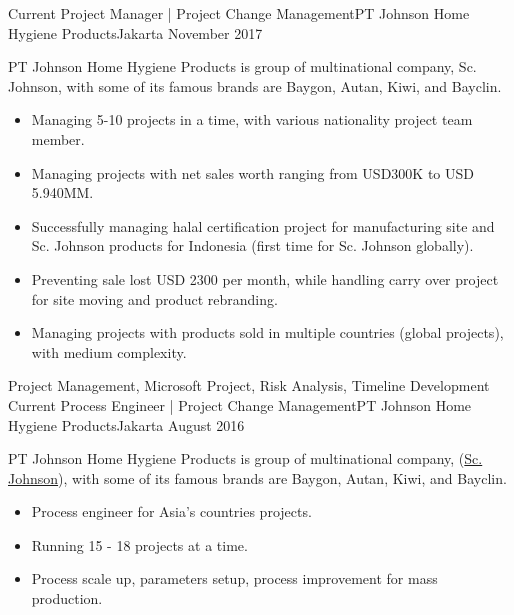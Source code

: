 %
%
%
\begin{experiences}
  \experience
    {Current} {Project Manager | Project Change Management}{PT Johnson Home Hygiene Products}{Jakarta}
    {November 2017} {PT Johnson Home Hygiene Products is group of multinational company, Sc. Johnson, with some of its famous brands are Baygon, Autan, Kiwi, and Bayclin.
                      \begin{itemize}
                        \item Managing 5-10 projects in a time, with various nationality project team member.                
                        \item Managing projects with net sales worth ranging from USD300K to USD 5.940MM.               
                        \item Successfully managing halal certification project for manufacturing site and Sc. Johnson products for Indonesia (first time for Sc. Johnson globally).              
                        \item Preventing sale lost USD 2300 per month, while handling carry over project for site moving and product rebranding.
                        \item Managing projects with products sold in multiple countries (global projects), with medium complexity.
                      \end{itemize}
                    }
                    {Project Management, Microsoft Project, Risk Analysis, Timeline Development}
  \emptySeparator
  \experience
    {Current} {Process Engineer | Project Change Management}{PT Johnson Home Hygiene Products}{Jakarta}
    {August 2016} {PT Johnson Home Hygiene Products is group of multinational company, (\href{https://www.scjohnson.com/}{Sc. Johnson}), with some of its famous brands are Baygon, Autan, Kiwi, and Bayclin.
                      \begin{itemize}
                        \item Process engineer for Asia’s countries projects.        
                        \item Running 15 - 18 projects at a time.
                        \item Process scale up, parameters setup, process improvement for mass production. 

\end{itemize}}
\end{experiences}
